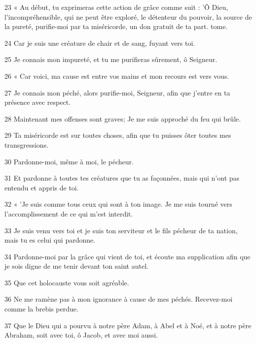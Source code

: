 \par 23 « Au début, tu exprimeras cette action de grâce comme suit : 'Ô Dieu, l'incompréhensible, qui ne peut être exploré, le détenteur du pouvoir, la source de la pureté, purifie-moi par ta miséricorde, un don gratuit de ta part. tome.

\par 24 Car je suis une créature de chair et de sang, fuyant vers toi.

\par 25 Je connais mon impureté, et tu me purifieras sûrement, ô Seigneur.

\par 26 « Car voici, ma cause est entre vos mains et mon recours est vers vous.

\par 27 Je connais mon péché, alors purifie-moi, Seigneur, afin que j'entre en ta présence avec respect.

\par 28 Maintenant mes offenses sont graves; Je me suis approché du feu qui brûle.

\par 29 Ta miséricorde est sur toutes choses, afin que tu puisses ôter toutes mes transgressions.

\par 30 Pardonne-moi, même à moi, le pécheur.

\par 31 Et pardonne à toutes tes créatures que tu as façonnées, mais qui n'ont pas entendu et appris de toi.

\par 32 « 'Je suis comme tous ceux qui sont à ton image. Je me suis tourné vers l'accomplissement de ce qui m'est interdit.

\par 33 Je suis venu vers toi et je suis ton serviteur et le fils pécheur de ta nation, mais tu es celui qui pardonne.

\par 34 Pardonne-moi par la grâce qui vient de toi, et écoute ma supplication afin que je sois digne de me tenir devant ton saint autel.

\par 35 Que cet holocauste vous soit agréable.

\par 36 Ne me ramène pas à mon ignorance à cause de mes péchés. Recevez-moi comme la brebis perdue.

\par 37 Que le Dieu qui a pourvu à notre père Adam, à Abel et à Noé, et à notre père Abraham, soit avec toi, ô Jacob, et avec moi aussi.

